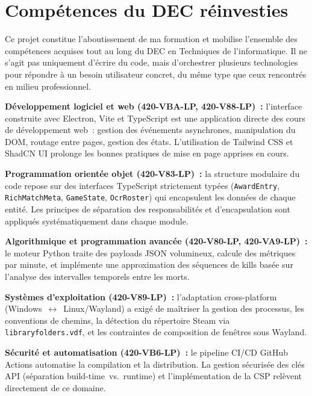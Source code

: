 \documentclass[12pt,a4paper]{article}
\begin{document}
\section{Compétences du DEC réinvesties}

Ce projet constitue l'aboutissement de ma formation et mobilise l'ensemble
des compétences acquises tout au long du DEC en Techniques de
l'informatique. Il ne s'agit pas uniquement d'écrire du code, mais
d'orchestrer plusieurs technologies pour répondre à un besoin utilisateur
concret, du même type que ceux rencontrés en milieu professionnel.

\textbf{Développement logiciel et web (420-VBA-LP, 420-V88-LP)~:}
l'interface construite avec Electron, Vite et TypeScript est une
application directe des cours de développement web~: gestion des
événements asynchrones, manipulation du DOM, routage entre pages, gestion
des états. L'utilisation de Tailwind CSS et ShadCN UI prolonge les bonnes
pratiques de mise en page apprises en cours.

\textbf{Programmation orientée objet (420-V83-LP)~:} la structure modulaire
du code repose sur des interfaces TypeScript strictement typées
(\texttt{AwardEntry}, \texttt{RichMatchMeta}, \texttt{GameState},
\texttt{OcrRoster}) qui encapsulent les données de chaque entité. Les
principes de séparation des responsabilités et d'encapsulation sont
appliqués systématiquement dans chaque module.

\textbf{Algorithmique et programmation avancée (420-V80-LP, 420-VA9-LP)~:}
le moteur Python traite des payloads JSON volumineux, calcule des métriques
par minute, et implémente une approximation des séquences de kills basée
sur l'analyse des intervalles temporels entre les morts.

\textbf{Systèmes d'exploitation (420-V89-LP)~:} l'adaptation
cross-platform (Windows~$\leftrightarrow$~Linux/Wayland) a exigé de
maîtriser la gestion des processus, les conventions de chemins, la
détection du répertoire Steam via \texttt{libraryfolders.vdf}, et les
contraintes de composition de fenêtres sous Wayland.

\textbf{Sécurité et automatisation (420-VB6-LP)~:} le pipeline CI/CD
GitHub Actions automatise la compilation et la distribution. La gestion
sécurisée des clés API (séparation build-time~vs.~runtime) et
l'implémentation de la CSP relèvent directement de ce domaine.
\end{document}
